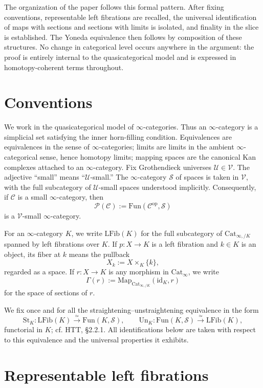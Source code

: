 \documentclass[11pt]{article}
\theoremstyle{definition}
\newcommand{\C}{\mathcal{C}}
\newcommand{\Sps}{\mathcal{S}}
\newcommand{\PSh}{\mathcal{P}(\mathcal{C})}
\newcommand{\U}{\mathcal{U}}
\newcommand{\V}{\mathcal{V}}
\newcommand{\Fun}{\mathrm{Fun}}
\newcommand{\Map}{\mathrm{Map}}
\newcommand{\LFib}{\mathrm{LFib}}
\newcommand{\St}{\mathrm{St}}
\newcommand{\Un}{\mathrm{Un}}
\newcommand{\id}{\mathrm{id}}
\newcommand{\op}{\mathrm{op}}
\begin{document}
The organization of the paper follows this formal pattern. After fixing
conventions, representable left fibrations are recalled, the universal
identification of maps with sections and sections with limits is isolated, and
finality in the slice is established. The Yoneda equivalence then follows by
composition of these structures. No change in categorical level occurs anywhere in
the argument: the proof is entirely internal to the quasicategorical model and is
expressed in homotopy-coherent terms throughout.

\section{Conventions}

We work in the quasicategorical model of $\infty$-categories. Thus an
$\infty$-category is a simplicial set satisfying the inner horn-filling
condition. Equivalences are equivalences in the sense of $\infty$-categories;
limits are limits in the ambient $\infty$-categorical sense, hence homotopy
limits; mapping spaces are the canonical Kan complexes attached to an
$\infty$-category. Fix Grothendieck universes $\U \in \V$. The adjective
``small'' means ``$\U$-small.'' The $\infty$-category $\Sps$ of spaces is taken in
$\V$, with the full subcategory of $\U$-small spaces understood implicitly.
Consequently, if $\C$ is a small $\infty$-category, then
\[
  \PSh := \Fun(\C^{\op},\Sps)
\]
is a $\V$-small $\infty$-category.

For an $\infty$-category $K$, we write $\LFib(K)$ for the full subcategory of
$\mathrm{Cat}_{\infty,/K}$ spanned by left fibrations over $K$. If $p \colon X \to K$ is a
left fibration and $k \in K$ is an object, its fiber at $k$ means the pullback
\[
  X_k := X \times_K \{k\},
\]
regarded as a space. If $r \colon X \to K$ is any morphism in $\mathrm{Cat}_{\infty}$, we
write
\[
  \Gamma(r) := \Map_{\mathrm{Cat}_{\infty,/K}}(\id_K,r)
\]
for the space of sections of $r$.

We fix once and for all the straightening--unstraightening equivalence in the
form
\[
  \St_K \colon \LFib(K) \xrightarrow{\simeq} \Fun(K,\Sps),
  \qquad
  \Un_K \colon \Fun(K,\Sps) \xrightarrow{\simeq} \LFib(K),
\]
functorial in $K$; cf. HTT, \S2.2.1. All identifications below are taken with
respect to this equivalence and the universal properties it exhibits.

\section{Representable left fibrations}
\end{document}
